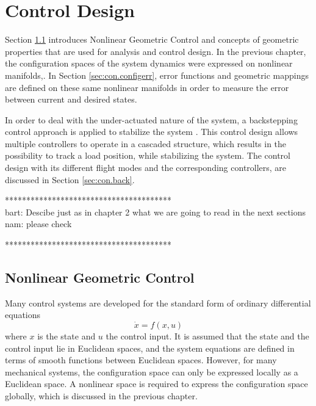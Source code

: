 \chapter{Control Design} \label{ch:control}
Section \ref{sec:con.nlgc} introduces Nonlinear Geometric Control and concepts of geometric properties that are used for analysis and control design.  
In the previous chapter, the configuration spaces of the system dynamics were expressed on nonlinear manifolds,.
In Section \ref{sec:con.configerr}, error functions and geometric mappings are defined on these same nonlinear manifolds in order to measure the error between current and desired states. 

In order to deal with the under-actuated nature of the system, a backstepping control approach is applied to stabilize the system .
This control design allows multiple controllers to operate in a cascaded structure, which results in the possibility to track a load position, while stabilizing the system.
The control design with its different flight modes and the corresponding controllers, are discussed in Section \ref{sec:con.back}.




***************************************\\
bart: Descibe just as in chapter 2 what we are going to read in the next sections\\
nam: please check

***************************************\\

\section{Nonlinear Geometric Control}\label{sec:con.nlgc}
Many control systems are developed for the standard form of ordinary differential equations
\begin{equation}\label{key}
 \dot{x}=f(x,u) 
\end{equation}
where $ x $ is the state and $ u $ the control input. It is assumed that the state and the control input lie in Euclidean spaces, and the system equations are defined in terms of smooth functions between Euclidean spaces. However, for many mechanical systems, the configuration space can only be expressed locally as a Euclidean space. 
A nonlinear space is required to express the configuration space globally, which is discussed in the previous chapter.


